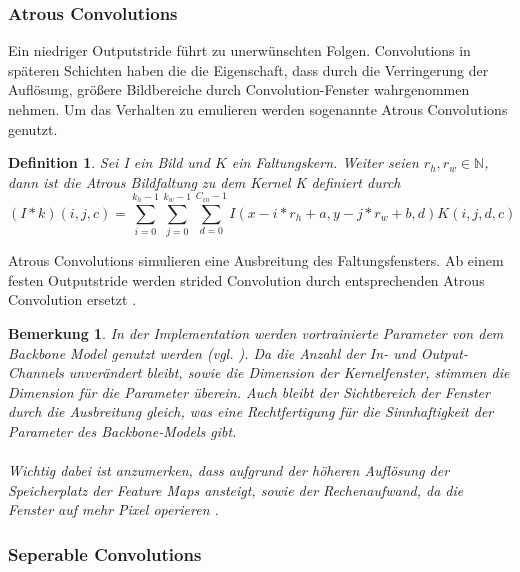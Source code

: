 \documentclass[12pt,DIV=15,BCOR=15mm,twoside,headsepline,abstract=true,listof=totoc,bibliography=totoc]{scrreprt}
\newtheorem{remark}{Bemerkung}[chapter]
\newtheorem{defi}{Definition}
\theoremstyle{remark}    %
\begin{document}
    \subsubsection{Atrous Convolutions}
    Ein niedriger Outputstride führt zu unerwünschten Folgen. Convolutions in späteren Schichten haben die die Eigenschaft, dass durch die Verringerung
    der Auflösung, größere Bildbereiche durch Convolution-Fenster wahrgenommen nehmen. Um das Verhalten zu emulieren werden sogenannte Atrous Convolutions genutzt. 
    \begin{defi}
    Sei I ein Bild und $K$ ein Faltungskern. Weiter seien $r_h, r_w \in \mathbb{N}$, dann ist die 
    Atrous Bildfaltung zu dem Kernel K definiert durch 
    \[
    (I * k)(i, j, c) = \sum_{i =0}^{k_h-1}\sum_{j=0}^{k_w-1} \sum_{d = 0}^{C_{in}-1}I(x-i*r_h +a, y-j*r_w+b, d)K(i,j,d,c)
    \]
    \end{defi}\noindent
    Atrous Convolutions simulieren eine Ausbreitung des Faltungsfensters. Ab einem festen Outputstride werden strided Convolution durch 
    entsprechenden Atrous Convolution ersetzt \cite{chen2017rethinkingatrousconvolutionsemantic}.
    \begin{remark}
    \label{bem:backboneparam}
        In der Implementation werden vortrainierte Parameter von dem Backbone Model genutzt werden (vgl. \cite{chen2017rethinkingatrousconvolutionsemantic,HaitzHuebnerUlrich2022}). 
        Da die Anzahl der In- und Output-Channels unverändert bleibt, 
        sowie die Dimension der Kernelfenster, stimmen die Dimension für die Parameter überein. Auch bleibt der Sichtbereich der Fenster durch die 
        Ausbreitung gleich, was eine Rechtfertigung für die Sinnhaftigkeit der Parameter des Backbone-Models gibt.\\\\
        Wichtig dabei ist anzumerken, dass aufgrund der höheren Auflösung der Speicherplatz der Feature Maps ansteigt, sowie der Rechenaufwand, da die Fenster auf 
        mehr Pixel operieren . \cite{Deeplabv3plus_PyTorch}
    \end{remark}

    \subsubsection{Seperable Convolutions}
\end{document}
